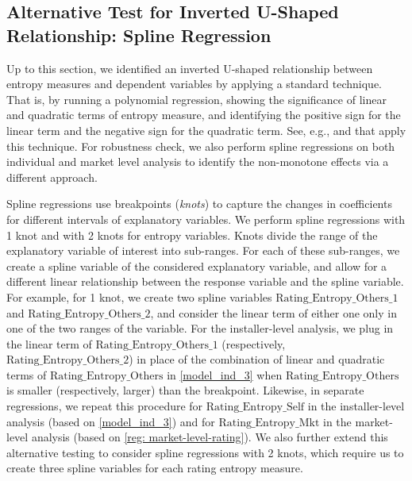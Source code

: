 \documentclass[mnsc,blindrev]{informs3}
\begin{document}
	
	
	
	\subsection{Alternative Test for Inverted U-Shaped Relationship: Spline Regression}
	
	
	Up to this section, we identified an inverted U-shaped relationship between entropy measures and dependent variables by applying a standard technique. That is, by running a polynomial regression, showing the significance of linear and quadratic terms of entropy measure, and identifying the positive sign for the linear term and the negative sign for the quadratic term. See, e.g., \cite{tan2014does} and \cite{kesavan2014volume} that apply this technique. For robustness check, we also perform spline regressions on both individual and market level analysis to identify the non-monotone effects via a different approach.

	
	Spline regressions use breakpoints (\emph{knots}) to capture the changes in coefficients for different intervals of explanatory variables. We perform spline regressions with 1 knot and with 2 knots for entropy variables. Knots divide the range of the explanatory variable of interest into sub-ranges. For each of these sub-ranges, we create a spline variable of the considered explanatory variable, and allow for a different linear relationship between the response variable and the spline variable. For example, for 1 knot, we create two spline variables $\text{Rating\_Entropy\_Others\_1}$ and  $\text{Rating\_Entropy\_Others\_2}$, and consider the linear term of either one only in one of the two ranges of the variable. For the installer-level analysis, we plug in the linear term of $\text{Rating\_Entropy\_Others\_1}$ (respectively, $\text{Rating\_Entropy\_Others\_2}$) in place of the combination of linear and quadratic terms of $\text{Rating\_Entropy\_Others}$ in \eqref{model_ind_3} when $\text{Rating\_Entropy\_Others}$ is smaller (respectively, larger) than the breakpoint.  Likewise, in separate regressions, we repeat this procedure for $\text{Rating\_Entropy\_Self}$ in the installer-level analysis (based on \eqref{model_ind_3}) and  for $\text{Rating\_Entropy\_Mkt}$ in the market-level analysis (based on \eqref{reg: market-level-rating}). We also further extend this alternative testing to consider spline regressions with 2 knots, which require us to create three spline variables for each rating entropy measure.
	
\end{document}
